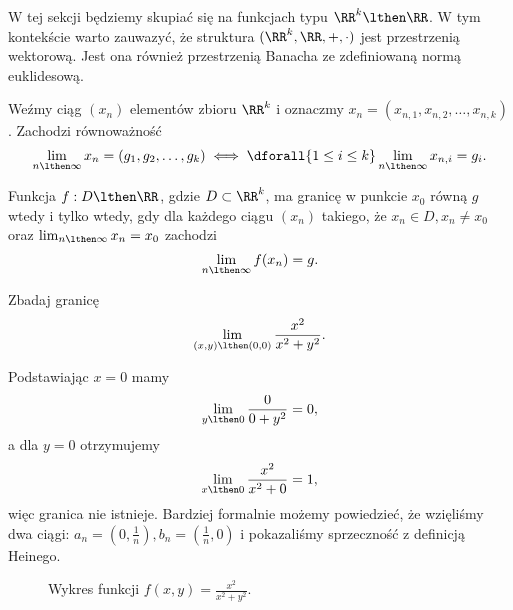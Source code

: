 W tej sekcji będziemy skupiać się na funkcjach typu $\RR^k \lthen \RR$. W tym kontekście warto zauwazyć, że struktura $(\RR^k, \RR, +, \cdot)$ jest przestrzenią wektorową. Jest ona również przestrzenią Banacha ze zdefiniowaną normą euklidesową.

\begin{fact}
    Weźmy ciąg $(x_n)$ elementów zbioru $\RR^k$ i oznaczmy $x_n = (x_{n,1}, x_{n,2}, \ldots, x_{n,k})$. Zachodzi równoważność
    \[ \lim_{n\lthen\infty} x_n = (g_1, g_2, \ldots, g_k) \iff \dforall{1\leq i\leq k} \lim_{n\lthen\infty}x_{n,i} = g_i. \]
\end{fact}

\begin{definition}[Heinego]
    Funkcja $f : D \lthen \RR$, gdzie $D\subset\RR^k$, ma granicę w punkcie $x_0$ równą $g$ wtedy i tylko wtedy, gdy dla każdego ciągu $(x_n)$ takiego, że $x_n \in D, x_n \neq x_0$ oraz $\lim_{n\lthen\infty} x_n = x_0$ zachodzi
    \[ \lim_{n\lthen\infty} f(x_n) = g. \]
\end{definition}

\begin{example}
    Zbadaj granicę
    \[ \lim_{(x, y)\lthen (0, 0)} \frac{x^2}{x^2 + y^2}. \]
\end{example}
\begin{solution}
    Podstawiając $x = 0$ mamy
    \[ \lim_{y\lthen 0} \frac{0}{0 + y^2} = 0, \]
    a dla $y = 0$ otrzymujemy
    \[ \lim_{x\lthen 0} \frac{x^2}{x^2 + 0} = 1, \]
    więc granica nie istnieje. Bardziej formalnie możemy powiedzieć, że wzięliśmy dwa ciągi: $a_n = (0, \frac{1}{n}), b_n = (\frac{1}{n}, 0)$ i pokazaliśmy sprzeczność z definicją Heinego.
\end{solution}

\begin{figure}[H]
    \centering
    \caption{Wykres funkcji $f(x, y) = \frac{x^2}{x^2 + y^2}$.}
\end{figure}

